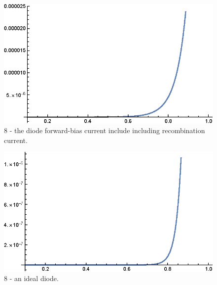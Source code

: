 \documentclass[a4paper]{article}
\begin{document}
\begin{figure}[H]
    \centering
    \includegraphics[width=1\textwidth]{3.eps}
    \caption{8 - the diode forward-bias current include including recombination current.}
\end{figure}
\begin{figure}[H]
    \centering
    \includegraphics[width=1\textwidth]{4.eps}
    \caption{8 - an ideal diode.}
\end{figure}
\end{document}
